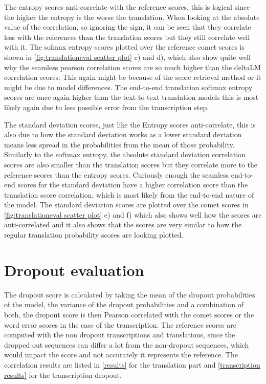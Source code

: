 The entropy scores anti-correlate with the reference scores, this is logical since the higher the entropy is the worse the translation. 
When looking at the absolute value of the correlation, so ignoring the sign, it can be seen that they correlate less with the references than the translation scores but they still correlate well with it. 
The sofmax entropy scores plotted over the reference comet scores is shown in \autoref{fig:translationeval scatter plot} c) and d), which also show quite well why the seamless pearson correlation scores are so much higher than the deltaLM correlation scores. This again might be because of the score retrieval method or it might be due to model differences. 
The end-to-end translation softmax entropy scores are once again higher than the text-to-text translation models this is most likely again due to less possible error from the transcription step.

The standard deviation scores, just like the Entropy scores anti-correlate, this is also due to how the standard deviation works as a lower standard deviation means less spread in the probabilities from the mean of those probability. 
Similarly to the softmax entropy, the absolute standard deviation correlation scores are also smaller than the translation scores but they correlate more to the reference scores than the entropy scores.
Curiously enough the seamless end-to-end scores for the standard deviation have a higher correlation score than the translation score correlation, which is most likely from the end-to-end nature of the model.
The standard deviation scores are plotted over the comet scores in \autoref{fig:translationeval scatter plot} e) and f) which also shows well how the scores are anti-correlated and it also shows that the scores are very similar to how the regular translation probability scores are looking plotted. 

\section{Dropout evaluation}
The dropout score is calculated by taking the mean of the dropout probabilities of the model, the variance of the dropout probabilities and a combination of both, the dropout score is then Pearson correlated with the comet scores or the word error scores in the case of the transcription. 
The reference scores are computed with the non dropout transcriptions and translations, since the dropped out sequences can differ a lot from the non-dropout sequences, which would impact the score and not accurately it represents the reference. 
The correlation results are listed in \autoref{results} for the translation part and \autoref{transcription results} for the transcription dropout. 


